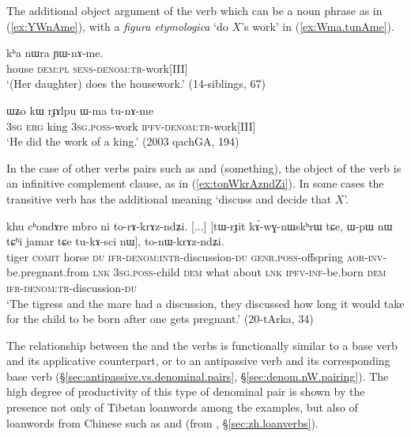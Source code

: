The additional object argument of the  verb which can be a noun phrase as in (\ref{ex:YWnAme}), with a \textit{figura etymologica}  `do $X$'s work' in (\ref{ex:Wma.tunAme}). 
  
\begin{exe}
\ex \label{ex:YWnAme}
 \gll kʰa nɯra ɲɯ-nɤ-me. \\
 house \textsc{dem}:\textsc{pl} \textsc{sens}-\textsc{denom}:\textsc{tr}-work[III] \\
 \glt `(Her daughter) does the housework.' (14-siblings, 67)
  \end{exe}
  
\begin{exe}
\ex \label{ex:Wma.tunAme}
 \gll  ɯʑo kɯ rɟɤlpu ɯ-ma tu-nɤ-me \\
 \textsc{3sg} \textsc{erg} king \textsc{3sg}.\textsc{poss}-work \textsc{ipfv}-\textsc{denom}:\textsc{tr}-work[III] \\
 \glt `He did the work of a king.' (2003 qachGA, 194)
    \end{exe}

  In the case of other verbs pairs such as  and  (something), the object of the  verb is an infinitive complement clause, as in (\ref{ex:tonWkrAzndZi}). In some cases the transitive verb  has the additional meaning `discuss and decide that $X$'.

\begin{exe}
\ex \label{ex:tonWkrAzndZi}
 \gll  khu cʰondɤre mbro ni to-rɤ-krɤz-ndʑi. [...] [tɯ-rɟit kɤ́-wɣ-nɯskʰrɯ tɕe,
ɯ-pɯ nɯ tɕʰi jamar tɕe tu-kɤ-sci nɯ], to-nɯ-krɤz-ndʑi. \\
tiger \textsc{comit} horse \textsc{du} \textsc{ifr}-\textsc{denom}:\textsc{intr}-discussion-\textsc{du} { }
\textsc{genr}.\textsc{poss}-offspring \textsc{aor}-\textsc{inv}-be.pregnant.from \textsc{lnk} \textsc{3sg}.\textsc{poss}-child \textsc{dem} what about \textsc{lnk} \textsc{ipfv}-\textsc{inf}-be.born \textsc{dem} \textsc{ifr}-\textsc{denom}:\textsc{tr}-discussion-\textsc{du} \\
\glt `The tigress and the mare had a discussion, they discussed how long it would take for the child to be born after one gets pregnant.' (20-tArka, 34)
 \end{exe}
 
 The relationship between the  and the  verbs is functionally similar to a base verb and its applicative counterpart, or to an antipassive verb and its corresponding base verb (§\ref{sec:antipassive.vs.denominal.pairs}, §\ref{sec:denom.nW.pairing}). The high degree of productivity of this type of denominal pair is shown by the presence not only of Tibetan loanwords among the examples, but also of loanwords from Chinese such as  and   (from , §\ref{sec:zh.loanverbs}).


